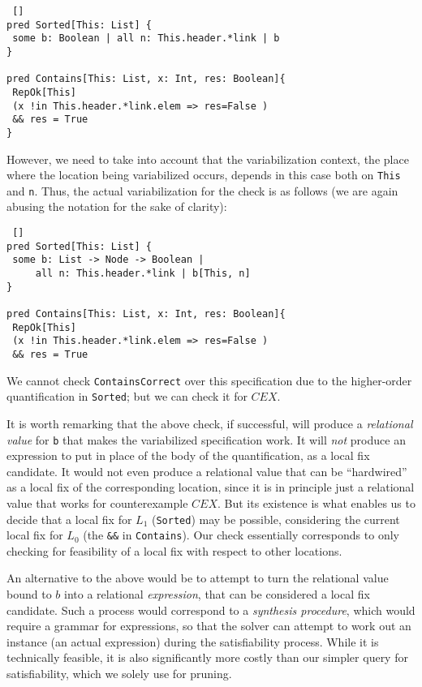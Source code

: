 \begin{lstlisting} []
pred Sorted[This: List] {
 some b: Boolean | all n: This.header.*link | b
}

pred Contains[This: List, x: Int, res: Boolean]{
 RepOk[This]
 (x !in This.header.*link.elem => res=False ) 
 && res = True
}
\end{lstlisting}

\noindent
However, we need to take into account that the variabilization context, the place where the location being variabilized occurs, depends in this case both on \texttt{This} and \texttt{n}. Thus, the actual variabilization for the check is as follows (we are again abusing the notation for the sake of clarity):

\begin{lstlisting} []
pred Sorted[This: List] {
 some b: List -> Node -> Boolean | 
     all n: This.header.*link | b[This, n]
}

pred Contains[This: List, x: Int, res: Boolean]{
 RepOk[This]
 (x !in This.header.*link.elem => res=False ) 
 && res = True
 \end{lstlisting}

\noindent
We cannot check \texttt{ContainsCorrect} over this specification due to the higher-order quantification in \texttt{Sorted}; but we can check it for $\textit{CEX}$. 

It is worth remarking that the above check, if successful, will produce a \emph{relational value} for \texttt{b} that makes the variabilized specification work. It will \emph{not} produce an expression to put in place of the body of the quantification, as a local fix candidate. It would not even produce a relational value that can be ``hardwired'' as a local fix of the corresponding location, since it is in principle just a relational value that works for counterexample $\textit{CEX}$. But its existence is what enables us to decide that a local fix for $L_1$ (\texttt{Sorted}) may be possible, considering the current local fix for $L_0$ (the \texttt{\&\&} in \texttt{Contains}). Our check essentially corresponds to only checking for feasibility of a local fix with respect to other locations. 

An alternative to the above would be to attempt to turn the relational value bound to $b$ into a relational \emph{expression}, that can be considered a local fix candidate. Such a process would correspond to a \emph{synthesis procedure}, which would require a grammar for expressions, so that the solver can attempt to work out an instance (an actual expression) during the satisfiability process. While it is technically feasible, it is also significantly more costly than our simpler query for satisfiability, which we solely use for pruning. 

